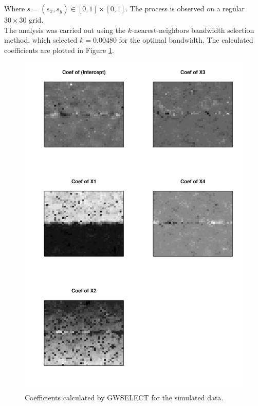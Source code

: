 \documentclass[authoryear ,review]{elsarticle}
\begin{document}
			Where $s=(s_x, s_y) \in [0,1] \times [0,1]$. The process is observed on a regular $30 \times 30$ grid.\\
			
			The analysis was carried out using the $k$-nearest-neighbors bandwidth selection method, which selected $k=0.00480$ for the optimal bandwidth. The calculated coefficients are plotted in Figure \ref{simulation-coefs}.\\			
			
			\begin{figure}
				\begin{center}
					\includegraphics{../../figures/simulation/coefs}
					\caption{Coefficients calculated by GWSELECT for the simulated data.\label{simulation-coefs}}
				\end{center}
			\end{figure}
			
		


\end{document}
